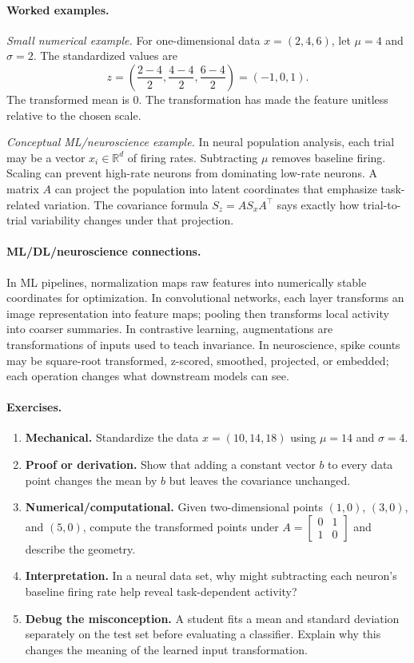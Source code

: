 \paragraph{Worked examples.}
\emph{Small numerical example.} For one-dimensional data \(x=(2,4,6)\), let \(\mu=4\) and \(\sigma=2\). The standardized values are
\[
z=\left(\frac{2-4}{2},\frac{4-4}{2},\frac{6-4}{2}\right)=(-1,0,1).
\]
The transformed mean is \(0\). The transformation has made the feature unitless relative to the chosen scale.

\emph{Conceptual ML/neuroscience example.} In neural population analysis, each trial may be a vector \(x_i\in\mathbb{R}^d\) of firing rates. Subtracting \(\mu\) removes baseline firing. Scaling can prevent high-rate neurons from dominating low-rate neurons. A matrix \(A\) can project the population into latent coordinates that emphasize task-related variation. The covariance formula \(S_z=A S_x A^\top\) says exactly how trial-to-trial variability changes under that projection.

\paragraph{ML/DL/neuroscience connections.}
In ML pipelines, normalization maps raw features into numerically stable coordinates for optimization. In convolutional networks, each layer transforms an image representation into feature maps; pooling then transforms local activity into coarser summaries. In contrastive learning, augmentations are transformations of inputs used to teach invariance. In neuroscience, spike counts may be square-root transformed, z-scored, smoothed, projected, or embedded; each operation changes what downstream models can see.

\paragraph{Exercises.}
\begin{enumerate}[label=\textbf{2.3.\arabic*.}, leftmargin=*]
\item \textbf{Mechanical.} Standardize the data \(x=(10,14,18)\) using \(\mu=14\) and \(\sigma=4\).
\item \textbf{Proof or derivation.} Show that adding a constant vector \(b\) to every data point changes the mean by \(b\) but leaves the covariance unchanged.
\item \textbf{Numerical/computational.} Given two-dimensional points \((1,0)\), \((3,0)\), and \((5,0)\), compute the transformed points under \(A=\begin{bmatrix}0&1\\1&0\end{bmatrix}\) and describe the geometry.
\item \textbf{Interpretation.} In a neural data set, why might subtracting each neuron's baseline firing rate help reveal task-dependent activity?
\item \textbf{Debug the misconception.} A student fits a mean and standard deviation separately on the test set before evaluating a classifier. Explain why this changes the meaning of the learned input transformation.
\end{enumerate}

